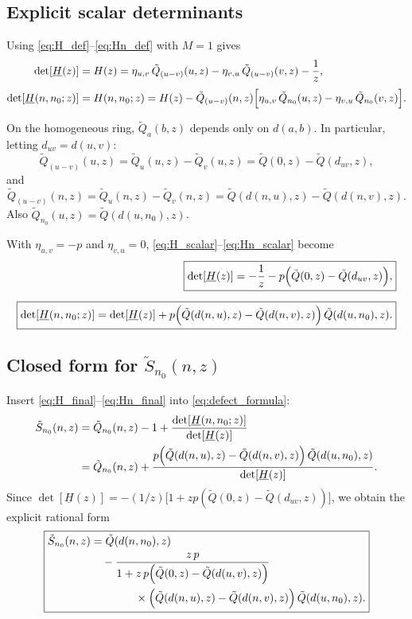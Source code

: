 \documentclass[11pt]{article}
\begin{document}
\subsection{Explicit scalar determinants}

Using \eqref{eq:H_def}--\eqref{eq:Hn_def} with $M=1$ gives
\begin{align}
\det[\underline{H}(z)]
&=
H(z)
=
\eta_{u,v}\,\tilde Q_{(u-v)}(u,z)-\eta_{v,u}\,\tilde Q_{(u-v)}(v,z)-\frac{1}{z},
\label{eq:H_scalar}\\[1mm]
\det[\underline{H}(n,n_0;z)]
&=
H(n,n_0;z)
=
H(z)-\tilde Q_{(u-v)}(n,z)\Bigl[\eta_{u,v}\,\tilde Q_{n_0}(u,z)-\eta_{v,u}\,\tilde Q_{n_0}(v,z)\Bigr].
\label{eq:Hn_scalar}
\end{align}

On the homogeneous ring, $\tilde Q_{a}(b,z)$ depends only on $d(a,b)$. In particular, letting $d_{uv}=d(u,v)$:
\[
\tilde Q_{(u-v)}(u,z)=\tilde Q_u(u,z)-\tilde Q_v(u,z)=\tilde Q(0,z)-\tilde Q(d_{uv},z),
\]
and
\[
\tilde Q_{(u-v)}(n,z)=\tilde Q_u(n,z)-\tilde Q_v(n,z)=\tilde Q(d(n,u),z)-\tilde Q(d(n,v),z).
\]
Also $\tilde Q_{n_0}(u,z)=\tilde Q(d(u,n_0),z)$.

With $\eta_{u,v}=-p$ and $\eta_{v,u}=0$, \eqref{eq:H_scalar}--\eqref{eq:Hn_scalar} become
\begin{align}
\boxed{
\det[\underline{H}(z)]
=
-\frac{1}{z}
-p\Bigl(\tilde Q(0,z)-\tilde Q(d_{uv},z)\Bigr),
}
\label{eq:H_final}\\[2mm]
\boxed{
\det[\underline{H}(n,n_0;z)]
=
\det[\underline{H}(z)]
+p\Bigl(\tilde Q(d(n,u),z)-\tilde Q(d(n,v),z)\Bigr)\,\tilde Q(d(u,n_0),z).
}
\label{eq:Hn_final}
\end{align}

\subsection{Closed form for $\tilde S_{n_0}(n,z)$}

Insert \eqref{eq:H_final}--\eqref{eq:Hn_final} into \eqref{eq:defect_formula}:
\begin{align*}
\tilde S_{n_0}(n,z)
&=
\tilde Q_{n_0}(n,z)-1+\frac{\det[\underline{H}(n,n_0;z)]}{\det[\underline{H}(z)]}\\
&=
\tilde Q_{n_0}(n,z)
 +
\frac{
p\Bigl(\tilde Q(d(n,u),z)-\tilde Q(d(n,v),z)\Bigr)\,\tilde Q(d(u,n_0),z)
}{
\det[\underline{H}(z)]
}.
\end{align*}
Since $\det[\underline{H}(z)]=-(1/z)\bigl[1+zp(\tilde Q(0,z)-\tilde Q(d_{uv},z))\bigr]$, we obtain the explicit rational form
\begin{equation}
\boxed{
\begin{aligned}
\tilde S_{n_0}(n,z)
&=
\tilde Q(d(n,n_0),z)\\
&\quad
- \frac{z\,p}{1+z\,p\Bigl(\tilde Q(0,z)-\tilde Q(d(u,v),z)\Bigr)}\\
&\qquad\qquad \times \Bigl(\tilde Q(d(n,u),z)-\tilde Q(d(n,v),z)\Bigr)\,\tilde Q(d(u,n_0),z).
\end{aligned}
}
\label{eq:S_closed}
\end{equation}
\end{document}

